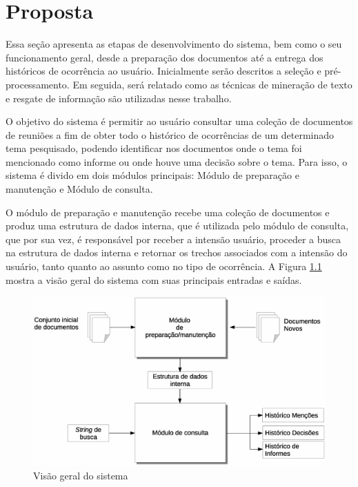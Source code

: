 \chapter{Proposta}\label{cap3}


Essa seção apresenta as etapas de desenvolvimento do sistema, bem como o seu funcionamento geral, desde a preparação dos documentos até a entrega dos históricos de ocorrência ao usuário. Inicialmente serão descritos a seleção e pré-processamento. Em seguida, será relatado como as técnicas de mineração de texto e resgate de informação são utilizadas nesse trabalho.

O objetivo do sistema é permitir ao usuário consultar uma coleção de documentos de reuniões a fim de obter todo o histórico de ocorrências de um determinado tema pesquisado, podendo identificar nos documentos onde o tema foi mencionado como informe ou onde houve uma decisão sobre o tema. Para isso, o sistema é divido em dois módulos principais: Módulo de preparação e manutenção e Módulo de consulta.

O módulo de preparação e manutenção recebe uma coleção de documentos e produz uma estrutura de dados interna, que é utilizada pelo módulo de consulta, que por sua vez, é responsável por receber a intensão usuário, proceder a busca na estrutura de dados interna e retornar os trechos associados com a intensão do usuário, tanto quanto ao assunto como no tipo de ocorrência. A Figura \ref{fig:visao-geral} mostra a visão geral do sistema com suas principais entradas e saídas. 


  \begin{figure}[!h]
	  \centering
	  \includegraphics[width=0.69\paperwidth]{conteudo/capitulos/figs/visao-geral-3.eps}
	  \caption{Visão geral do sistema}
	  \label{fig:visao-geral}
  \end{figure}






